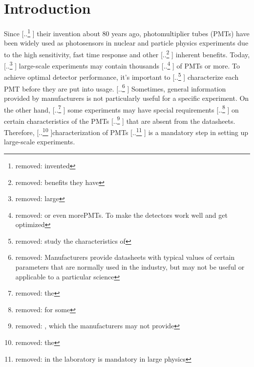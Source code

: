 \documentclass{nst}
\providecommand{\DIFadd}[1]{{\protect\color{blue} \sf #1}} %
\providecommand{\DIFdel}[1]{{\protect\color{red} [..\footnote{removed: #1} ]}} %
\providecommand{\DIFaddbegin}{} %
\providecommand{\DIFaddend}{} %
\providecommand{\DIFdelbegin}{} %
\providecommand{\DIFdelend}{} %
\begin{document}

\maketitle


\section{Introduction}
\label{sec:introduction}

Since \DIFdelbegin \DIFdel{invented }\DIFdelend \DIFaddbegin \DIFadd{their invention }\DIFaddend about 80 years ago, photomultiplier tubes (PMTs) have been widely used as photosensors in nuclear and particle physics experiments due to the high sensitivity, fast time response and other \DIFdelbegin \DIFdel{benefits they have}\DIFdelend \DIFaddbegin \DIFadd{inherent benefits}\DIFaddend . 
Today, \DIFdelbegin \DIFdel{large }\DIFdelend \DIFaddbegin \DIFadd{large-scale }\DIFaddend experiments may contain thousands \DIFdelbegin \DIFdel{or even morePMTs. To make the detectors work well and get optimized }\DIFdelend \DIFaddbegin \DIFadd{of PMTs or more. To achieve optimal detector }\DIFaddend performance, it's important to \DIFdelbegin \DIFdel{study the characteristics of }\DIFdelend \DIFaddbegin \DIFadd{characterize }\DIFaddend each PMT before they are put into usage. 
\DIFdelbegin \DIFdel{Manufacturers provide datasheets with typical values of certain parameters that are normally used in the industry, but may not be useful or applicable to a particular science }\DIFdelend %
\DIFaddbegin \DIFadd{Sometimes, general information provided by manufacturers is not particularly useful for a specific }\DIFaddend experiment.
On the other hand, \DIFdelbegin \DIFdel{the }\DIFdelend \DIFaddbegin \DIFadd{some }\DIFaddend experiments may have special requirements \DIFdelbegin \DIFdel{for some }\DIFdelend \DIFaddbegin \DIFadd{on certain }\DIFaddend characteristics of the PMTs \DIFdelbegin \DIFdel{, which the manufacturers may not provide}\DIFdelend \DIFaddbegin \DIFadd{that are absent from the datasheets}\DIFaddend . 
Therefore, \DIFdelbegin \DIFdel{the }\DIFdelend characterization of PMTs \DIFdelbegin \DIFdel{in the laboratory is mandatory in large physics }\DIFdelend \DIFaddbegin \DIFadd{is a mandatory step in setting up large-scale }\DIFaddend experiments.
\end{document}
